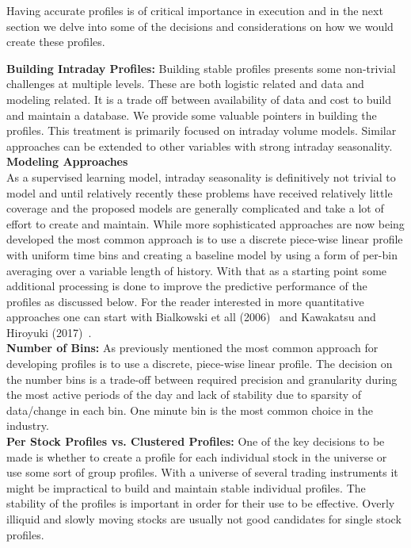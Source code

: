 Having accurate profiles is of critical importance in execution and in the next section we delve into some of the decisions and considerations on how we would create these profiles.



\noindent\textbf{Building Intraday Profiles:} Building stable profiles presents some non-trivial challenges at multiple levels. These are both logistic related and data and modeling related. It is a trade off between availability of data and cost to build and maintain a database. We provide some valuable pointers in building the profiles. This treatment is primarily focused on intraday volume models. Similar approaches can be extended to other variables with strong intraday seasonality. \\


\noindent\textbf{Modeling Approaches} \\

As a supervised learning model, intraday seasonality is definitively not trivial to model and until relatively recently these problems have received relatively little coverage and the proposed models are generally complicated and take a lot of effort to create and maintain. While more sophisticated approaches are now being developed the most common approach is to use a discrete piece-wise linear profile with uniform time bins and creating a baseline model by using a form of per-bin averaging over a variable length of history. With that as a starting point some additional processing is done to improve the predictive performance of the profiles as discussed below. For the reader interested in more quantitative approaches one can start with Bialkowski et all (2006)~\cite{bidafol} and Kawakatsu and Hiroyuki (2017)~\cite{kawhiro}. \\


\noindent\textbf{Number of Bins:} As previously mentioned the most common approach for developing profiles is to use a discrete, piece-wise linear profile. The decision on the number bins is a trade-off between required precision and granularity during the most active periods of the day and lack of stability due to sparsity of data/change in each bin. One minute bin is the most common choice in the industry. \\


\noindent\textbf{Per Stock Profiles vs. Clustered Profiles:} One of the key decisions to be made is whether to create a profile for each individual stock in the universe or use some sort of group profiles. With a universe of several trading instruments it might be impractical to build and maintain stable individual profiles. The stability of the profiles is important in order for their use to be effective. Overly illiquid and slowly moving stocks are usually not good candidates for single stock profiles. 


